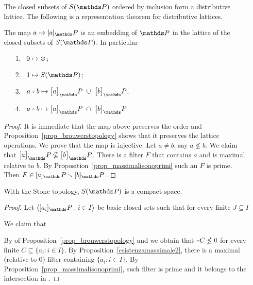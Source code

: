 \documentclass[creche.tex]{subfiles}
\begin{document}
The closed subsets of $S(\PP)$ ordered by inclusion form a distributive lattice.
The following is a representation theorem for distributive lattices.

\begin{theorem}
The map $a\mapsto [a]_\PP$ is an embedding of $\PP$ in the lattice of the closed subsets of $S(\PP)$.
In particular
\begin{itemize}
\item[1.]\ $0\mapsto \varnothing$;
\item[2.]\ $1\mapsto S(\PP)$;
\item[3.]\ $a\svee b\mapsto \big[a\big]_\PP\ \cup\ \big[b\big]_\PP$;
\item[4.]\ $a\swedge b\mapsto\big[a\big]_\PP\ \cap\ \big[b\big]_\PP$.
\end{itemize}
\end{theorem}

\begin{proof}
It is immediate that the map above preserves the order and Proposition~\ref{prop_brouwerstopology} shows that it preserves the lattice operations.
We prove that the map is injective.
Let $a\neq b$, say  $a\nleq b$.
We claim that $\big[a\big]_\PP\nsubseteq\big[b\big]_\PP$.
There is a filter $F$ that contains $a$ and is maximal relative to $b$.
By Proposition~\ref{prop_massimalisonoprimi} such an $F$ is prime.
Then $F\in [a]_\PP\sm[b]_\PP$.
\end{proof}


\begin{theorem}\label{thm_reticolocompatto}
With the Stone topology, $S(\PP)$ is a compact space.
\end{theorem}
\begin{proof}
Let $\<[a_i]_\PP:i\in I\>$ be basic closed sets such that for every finite $J\subseteq I$


We claim that


By  of Proposition~\ref{prop_brouwerstopology} and  we obtain that $\swedge C\nleq 0$ for every finite $C\subseteq \{a_i:i\in I\}$.
By Proposition~\ref{esistenzamassimale2}, there is a maximal (relative to $0$) filter containing $\{a_i:i\in I\}$.
By Proposition~\ref{prop_massimalisonoprimi}, such filter is prime and it belongs to the intersection in .
\end{proof}
\end{document}
